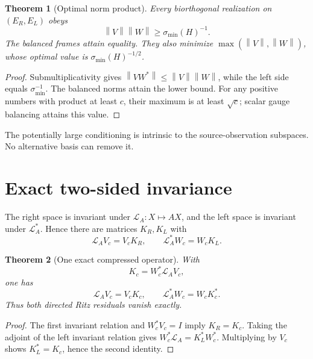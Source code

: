 \documentclass[12pt]{article}
\newtheorem{theorem}{Theorem}[section]
\theoremstyle{remark}
\newcommand{\cL}{\mathcal L}
\newcommand{\norm}[1]{\left\lVert#1\right\rVert}
\begin{document}
\begin{theorem}[Optimal norm product]\label{thm:optimal}
Every biorthogonal realization on $(E_R,E_L)$ obeys
\begin{equation}\label{eq:product-lower}
 \norm V\norm W\ge\sigma_{\min}(H)^{-1}.
\end{equation}
The balanced frames attain equality.  They also minimize
$\max(\norm V,\norm W)$, whose optimal value is
$\sigma_{\min}(H)^{-1/2}$.
\end{theorem}

\begin{proof}
Submultiplicativity gives
$\norm{VW^*}\le\norm V\norm W$, while the left side equals
$\sigma_{\min}^{-1}$.  The balanced norms attain the lower bound.  For any
positive numbers with product at least $c$, their maximum is at least
$\sqrt c$; scalar gauge balancing attains this value.
\end{proof}

The potentially large conditioning is intrinsic to the source-observation
subspaces.  No alternative basis can remove it.

\section{Exact two-sided invariance}

The right space is invariant under $\cL_A:X\mapsto AX$, and the left space
is invariant under $\cL_A^*$.  Hence there are matrices $K_R,K_L$ with
\begin{equation}\label{eq:invariance}
 \cL_AV_c=V_cK_R,
 \qquad
 \cL_A^*W_c=W_cK_L.
\end{equation}

\begin{theorem}[One exact compressed operator]\label{thm:exact-compression}
With
\begin{equation}\label{eq:compressed}
 K_c=W_c^*\cL_AV_c,
\end{equation}
one has
\begin{equation}\label{eq:two-sided}
 \boxed{
 \cL_AV_c=V_cK_c,
 \qquad
 \cL_A^*W_c=W_cK_c^*.
 }
\end{equation}
Thus both directed Ritz residuals vanish exactly.
\end{theorem}

\begin{proof}
The first invariant relation and $W_c^*V_c=I$ imply $K_R=K_c$.  Taking the
adjoint of the left invariant relation gives
$W_c^*\cL_A=K_L^*W_c^*$.  Multiplying by $V_c$ shows
$K_L^*=K_c$, hence the second identity.
\end{proof}
\end{document}
